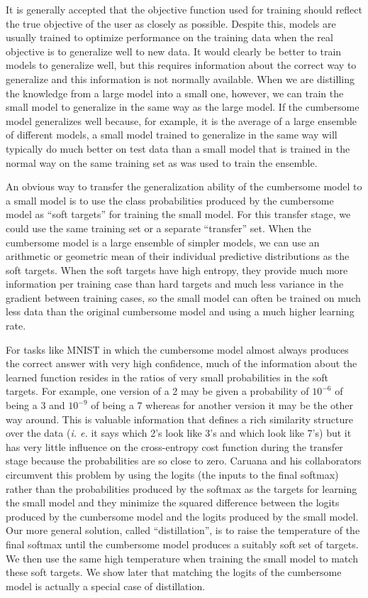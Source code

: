 It is generally accepted that the objective function used for training should reflect the true objective of the user as
closely as possible. Despite this, models are usually trained to optimize performance on the training data when the real
objective is to generalize well to new data. It would clearly be better to train models to generalize well, but this
requires information about the correct way to generalize and this information is not normally available.  When we are
distilling the knowledge from a large model into a small one, however, we can train the small model to generalize in the
same way as the large model. If the cumbersome model generalizes well because, for example, it is the average of a large
ensemble of different models, a small model trained to generalize in the same way will typically do much better on test
data than a small model that is trained in the normal way on the same training set as was used to train the ensemble. 

An obvious way to transfer the generalization ability of the cumbersome model to a small model is to use the class
probabilities produced by the cumbersome model as ``soft targets'' for training the small model. For this transfer
stage, we could use the same training set or a separate ``transfer'' set.  When the
cumbersome model is a large ensemble of simpler models, we can use an arithmetic or geometric mean of their individual predictive distributions as the soft targets.  When the soft
targets have high entropy, they provide much more information per training case than hard targets and much less variance
in the gradient between training cases, so the small model can often be trained on much less data than the original
cumbersome model and using a much higher learning rate.

For tasks like MNIST in which the cumbersome model almost always produces the correct answer with very high confidence,
much of the information about the learned function resides in the ratios of very small probabilities in the soft
targets. For example, one version of a 2 may be given a probability of $10^{-6}$ of being a 3 and $10^{-9}$ of being a 7
whereas for another version it may be the other way around. This is valuable information that defines a rich similarity
structure over the data ({\it i. e.} it says which 2's look like 3's and which look like 7's) but it has very little
influence on the cross-entropy cost function during the transfer stage because the probabilities are so close to zero.
Caruana and his collaborators circumvent this problem by using the logits (the inputs to the final softmax) rather than
the probabilities produced by the softmax as the targets for learning the small model and they minimize the squared
difference between the logits produced by the cumbersome model and the logits produced by the small model.  Our more
general solution, called ``distillation'', is to raise the temperature of the final softmax until the cumbersome model
produces a suitably soft set of targets. We then use the same high temperature when training the small model to match
these soft targets. We show later that matching the logits of the cumbersome model is actually a special case of
distillation.

